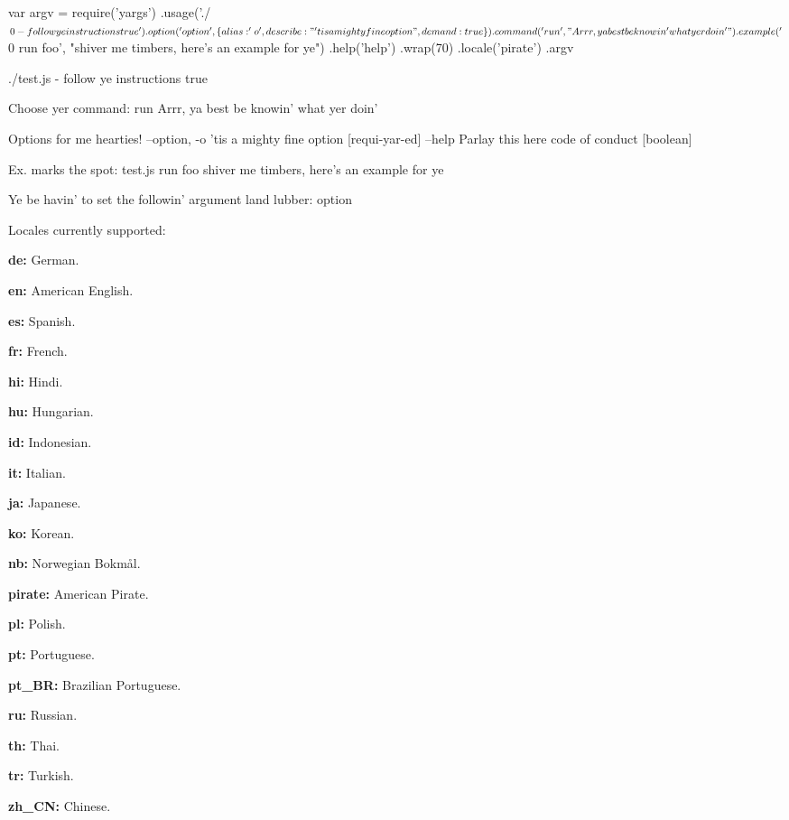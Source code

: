 \begin{DoxyCode}
var argv = require('yargs')
  .usage('./$0 - follow ye instructions true')
  .option('option', \{
    alias: 'o',
    describe: "'tis a mighty fine option",
    demand: true
  \})
  .command('run', "Arrr, ya best be knowin' what yer doin'")
  .example('$0 run foo', "shiver me timbers, here's an example for ye")
  .help('help')
  .wrap(70)
  .locale('pirate')
  .argv
\end{DoxyCode}







\begin{DoxyCode}
./test.js - follow ye instructions true

Choose yer command:
  run  Arrr, ya best be knowin' what yer doin'

Options for me hearties!
  --option, -o  'tis a mighty fine option               [requi-yar-ed]
  --help        Parlay this here code of conduct             [boolean]

Ex. marks the spot:
  test.js run foo  shiver me timbers, here's an example for ye

Ye be havin' to set the followin' argument land lubber: option
\end{DoxyCode}


Locales currently supported\+:


\begin{DoxyItemize}
\item {\bfseries de\+:} German.
\item {\bfseries en\+:} American English.
\item {\bfseries es\+:} Spanish.
\item {\bfseries fr\+:} French.
\item {\bfseries hi\+:} Hindi.
\item {\bfseries hu\+:} Hungarian.
\item {\bfseries id\+:} Indonesian.
\item {\bfseries it\+:} Italian.
\item {\bfseries ja\+:} Japanese.
\item {\bfseries ko\+:} Korean.
\item {\bfseries nb\+:} Norwegian Bokmål.
\item {\bfseries pirate\+:} American Pirate.
\item {\bfseries pl\+:} Polish.
\item {\bfseries pt\+:} Portuguese.
\item {\bfseries pt\+\_\+\+BR\+:} Brazilian Portuguese.
\item {\bfseries ru\+:} Russian.
\item {\bfseries th\+:} Thai.
\item {\bfseries tr\+:} Turkish.
\item {\bfseries zh\+\_\+\+CN\+:} Chinese.
\end{DoxyItemize}

